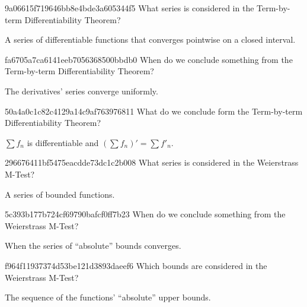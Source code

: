 \begin{note}{9a06615f719646bb8e4bde3a605344f5}
    What series is considered in the Term-by-term Differentiability Theorem?

    \begin{cloze}{1}
        A series of differentiable functions that converges pointwise on a closed interval.
    \end{cloze}
\end{note}

\begin{note}{fa6705a7ca6141eeb7056368500bbdb0}
    When do we conclude something from the Term-by-term Differentiability Theorem?

    \begin{cloze}{1}
        The derivatives' series converge uniformly.
    \end{cloze}
\end{note}

\begin{note}{50a4a0c1c82c4129a14c9af763976811}
    What do we conclude form the Term-by-term Differentiability Theorem?

    \begin{cloze}{1}
        \({ \sum f_n }\) is differentiable and \({ \left( \sum f_n \right)' = \sum f'_n }\).
    \end{cloze}
\end{note}

\begin{note}{296676411bf5475eacdde73dc1c2b008}
    What series is considered in the Weierstrass M-Test?

    \begin{cloze}{1}
        A series of bounded functions.
    \end{cloze}
\end{note}

\begin{note}{5c393b177b724cf69790bafcf0ff7b23}
    When do we conclude something from the Weierstrass M-Test?

    \begin{cloze}{1}
        When the series of ``absolute'' bounds converges.
    \end{cloze}
\end{note}

\begin{note}{f964f11937374d53be121d3893daeef6}
    Which bounds are considered in the Weierstrass M-Test?

    \begin{cloze}{1}
        The sequence of the functions' ``absolute'' upper bounds.
    \end{cloze}
\end{note}

